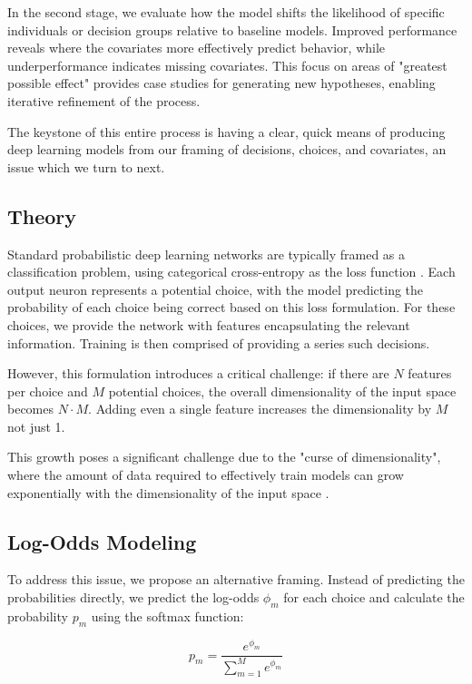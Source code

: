 \documentclass[11pt]{article}
\begin{document}
In the second stage, we evaluate how the model shifts the likelihood of specific individuals or decision groups relative to baseline models. Improved performance reveals where the covariates more effectively predict behavior, while underperformance indicates missing covariates. This focus on areas of "greatest possible effect" provides case studies for generating new hypotheses, enabling iterative refinement of the process.

The keystone of this entire process is having a clear, quick means of producing deep learning models from our framing of decisions, choices, and covariates, an issue which we turn to next. 

\subsection*{Theory}

Standard probabilistic deep learning networks are typically framed as a classification problem, using categorical cross-entropy as the loss function \citep{durr}. Each output neuron represents a potential choice, with the model predicting the probability of each choice being correct based on this loss formulation. For these choices, we provide the network with features encapsulating the relevant information. Training is then comprised of providing a series such decisions. 

However, this formulation introduces a critical challenge: if there are $N$ features per choice and $M$ potential choices, the overall dimensionality of the input space becomes $N \cdot M$. Adding even a single feature increases the dimensionality by $M$ not just 1.

This growth poses a significant challenge due to the "curse of dimensionality", where the amount of data required to effectively train models can grow exponentially with the dimensionality of the input space \citep{curse}.

\subsection*{Log-Odds Modeling}

To address this issue, we propose an alternative framing. Instead of predicting the probabilities directly, we predict the log-odds $\phi_m$ for each choice and calculate the probability $p_m$ using the softmax function:

$$p_m = \frac{e^{\phi_m}}{\sum_{m=1}^{M}e^{\phi_m}}$$
\end{document}
